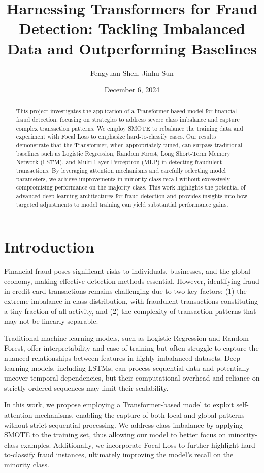 \documentclass[11pt, oneside]{article}   	%
\title{Harnessing Transformers for Fraud Detection: Tackling Imbalanced Data and Outperforming Baselines}
\author{Fengyuan Shen, Jinhu Sun}
\date{December 6, 2024}		%
\begin{document}
\maketitle
\begin{abstract}
This project investigates the application of a Transformer-based model for financial fraud detection, focusing on strategies to address severe class imbalance and capture complex transaction patterns. We employ SMOTE to rebalance the training data and experiment with Focal Loss to emphasize hard-to-classify cases. Our results demonstrate that the Transformer, when appropriately tuned, can surpass traditional baselines such as Logistic Regression, Random Forest, Long Short-Term Memory Network (LSTM), and Multi-Layer Perceptron (MLP) in detecting fraudulent transactions. By leveraging attention mechanisms and carefully selecting model parameters, we achieve improvements in minority-class recall without excessively compromising performance on the majority class. This work highlights the potential of advanced deep learning architectures for fraud detection and provides insights into how targeted adjustments to model training can yield substantial performance gains.
\end{abstract}


\section{Introduction}

Financial fraud poses significant risks to individuals, businesses, and the global economy, making effective detection methods essential. However, identifying fraud in credit card transactions remains challenging due to two key factors: (1) the extreme imbalance in class distribution, with fraudulent transactions constituting a tiny fraction of all activity, and (2) the complexity of transaction patterns that may not be linearly separable.

Traditional machine learning models, such as Logistic Regression and Random Forest, offer interpretability and ease of training but often struggle to capture the nuanced relationships between features in highly imbalanced datasets. Deep learning models, including LSTMs, can process sequential data and potentially uncover temporal dependencies, but their computational overhead and reliance on strictly ordered sequences may limit their scalability.

In this work, we propose employing a Transformer-based model to exploit self-attention mechanisms, enabling the capture of both local and global patterns without strict sequential processing. We address class imbalance by applying SMOTE to the training set, thus allowing our model to better focus on minority-class examples. Additionally, we incorporate Focal Loss to further highlight hard-to-classify fraud instances, ultimately improving the model’s recall on the minority class.
\end{document}
